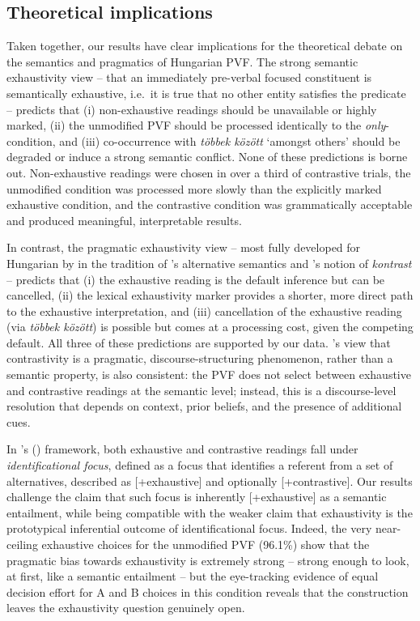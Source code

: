 \documentclass[a4paper, ruler]{CUP-JNL-LIN}%
\begin{document}
\subsection{Theoretical implications}

Taken together, our results have clear implications for the theoretical debate on the semantics and pragmatics of Hungarian PVF. The strong semantic exhaustivity view -- that an immediately pre-verbal focused constituent is semantically exhaustive, i.e.\ it is true that no other entity satisfies the predicate \citep{szabolcsi_1981_compositionality,ekiss_1998_identificational,ekiss_2007_topic,kenesei_2006_focus,horvath_2008_separating} -- predicts that (i) non-exhaustive readings should be unavailable or highly marked, (ii) the unmodified PVF should be processed identically to the \textit{only}-condition, and (iii) co-occurrence with \textit{többek között} `amongst others' should be degraded or induce a strong semantic conflict. None of these predictions is borne out. Non-exhaustive readings were chosen in over a third of contrastive trials, the unmodified condition was processed more slowly than the explicitly marked exhaustive condition, and the contrastive condition was grammatically acceptable and produced meaningful, interpretable results.

In contrast, the pragmatic exhaustivity view -- most fully developed for Hungarian by \citet{balogh_2013_hungarian} in the tradition of \citet{rooth_1992_theory}'s alternative semantics and \citet{vallduvi_1998_rheme}'s notion of \textit{kontrast} -- predicts that (i) the exhaustive reading is the default inference but can be cancelled, (ii) the lexical exhaustivity marker provides a shorter, more direct path to the exhaustive interpretation, and (iii) cancellation of the exhaustive reading (via \textit{többek között}) is possible but comes at a processing cost, given the competing default. All three of these predictions are supported by our data. \citet{zimmermann_2008_contrastive}'s view that contrastivity is a pragmatic, discourse-structuring phenomenon, rather than a semantic property, is also consistent: the PVF does not select between exhaustive and contrastive readings at the semantic level; instead, this is a discourse-level resolution that depends on context, prior beliefs, and the presence of additional cues.

In \citeauthor{ekiss_1998_identificational}'s (\citeyear{ekiss_1998_identificational}) framework, both exhaustive and contrastive readings fall under \textit{identificational focus}, defined as a focus that identifies a referent from a set of alternatives, described as [+exhaustive] and optionally [+contrastive]. Our results challenge the claim that such focus is inherently [+exhaustive] as a semantic entailment, while being compatible with the weaker claim that exhaustivity is the prototypical inferential outcome of identificational focus. Indeed, the very near-ceiling exhaustive choices for the unmodified PVF (96.1\%) show that the pragmatic bias towards exhaustivity is extremely strong -- strong enough to look, at first, like a semantic entailment -- but the eye-tracking evidence of equal decision effort for A and B choices in this condition reveals that the construction leaves the exhaustivity question genuinely open.
\end{document}
